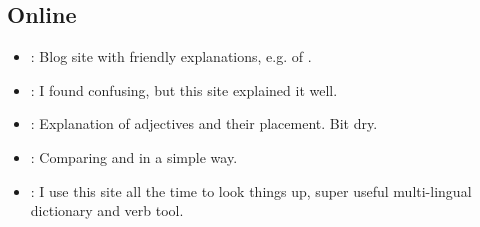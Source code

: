 \subsection*{Online}
    \begin{itemize}
        \item \cite{Cangiano}: Blog site with friendly explanations, e.g. of .
        \item \cite{Capilli}: I found  confusing, but this site explained it well.
        \item \cite{Polyglottist}: Explanation of adjectives and their placement. Bit dry.
        \item \cite{Quesito}: Comparing  and  in a simple way.
        \item \cite{Wordreference}: I use this site all the time to look things up, super useful multi-lingual dictionary and verb tool.        
    \end{itemize}  
